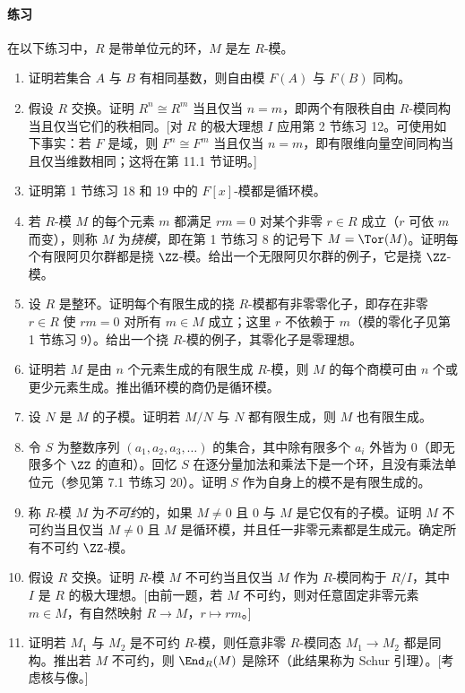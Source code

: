 \paragraph{练习}
在以下练习中，$R$ 是带单位元的环，$M$ 是左 $R$-模。
\begin{enumerate}[label=\arabic*.]
	\item 证明若集合 $A$ 与 $B$ 有相同基数，则自由模 $F(A)$ 与 $F(B)$ 同构。
	\item 假设 $R$ 交换。证明 $R^n\cong R^m$ 当且仅当 $n=m$，即两个有限秩自由 $R$-模同构当且仅当它们的秩相同。[对 $R$ 的极大理想 $I$ 应用第 2 节练习 12。可使用如下事实：若 $F$ 是域，则 $F^n\cong F^m$ 当且仅当 $n=m$，即有限维向量空间同构当且仅当维数相同；这将在第 11.1 节证明。]
	\item 证明第 1 节练习 18 和 19 中的 $F[x]$-模都是循环模。
	\item 若 $R$-模 $M$ 的每个元素 $m$ 都满足 $rm=0$ 对某个非零 $r\in R$ 成立（$r$ 可依 $m$ 而变），则称 $M$ 为\emph{挠模}，即在第 1 节练习 8 的记号下 $M=\Tor(M)$。证明每个有限阿贝尔群都是挠 $\ZZ$-模。给出一个无限阿贝尔群的例子，它是挠 $\ZZ$-模。
	\item 设 $R$ 是整环。证明每个有限生成的挠 $R$-模都有非零零化子，即存在非零 $r\in R$ 使 $rm=0$ 对所有 $m\in M$ 成立；这里 $r$ 不依赖于 $m$（模的零化子见第 1 节练习 9）。给出一个挠 $R$-模的例子，其零化子是零理想。
	\item 证明若 $M$ 是由 $n$ 个元素生成的有限生成 $R$-模，则 $M$ 的每个商模可由 $n$ 个或更少元素生成。推出循环模的商仍是循环模。
	\item 设 $N$ 是 $M$ 的子模。证明若 $M/N$ 与 $N$ 都有限生成，则 $M$ 也有限生成。
	\item 令 $S$ 为整数序列 $(a_1,a_2,a_3,\ldots)$ 的集合，其中除有限多个 $a_i$ 外皆为 $0$（即无限多个 $\ZZ$ 的直和）。回忆 $S$ 在逐分量加法和乘法下是一个环，且没有乘法单位元（参见第 7.1 节练习 20）。证明 $S$ 作为自身上的模不是有限生成的。
	\item 称 $R$-模 $M$ 为\emph{不可约}的，如果 $M\neq0$ 且 $0$ 与 $M$ 是它仅有的子模。证明 $M$ 不可约当且仅当 $M\neq0$ 且 $M$ 是循环模，并且任一非零元素都是生成元。确定所有不可约 $\ZZ$-模。
	\item 假设 $R$ 交换。证明 $R$-模 $M$ 不可约当且仅当 $M$ 作为 $R$-模同构于 $R/I$，其中 $I$ 是 $R$ 的极大理想。[由前一题，若 $M$ 不可约，则对任意固定非零元素 $m\in M$，有自然映射 $R\to M$，$r\mapsto rm$。]
	\item 证明若 $M_1$ 与 $M_2$ 是不可约 $R$-模，则任意非零 $R$-模同态 $M_1\to M_2$ 都是同构。推出若 $M$ 不可约，则 $\End_R(M)$ 是除环（此结果称为 Schur 引理）。[考虑核与像。]

\end{enumerate}
